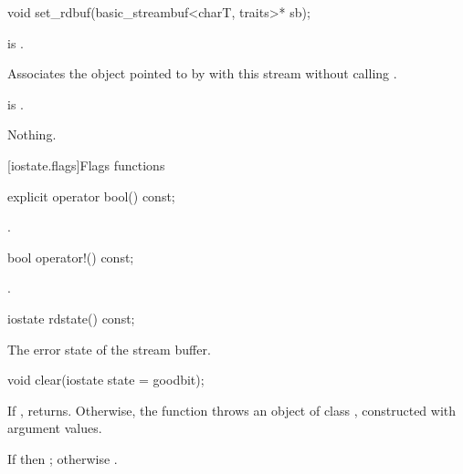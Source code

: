 %
\begin{itemdecl}
void set_rdbuf(basic_streambuf<charT, traits>* sb);
\end{itemdecl}

\begin{itemdescr}
\pnum
\expects
{} is .

\pnum
\effects
Associates the  object
pointed to by  with this stream without calling
.

\pnum
\ensures
{} is .

\pnum
\throws
Nothing.
\end{itemdescr}

[iostate.flags]{Flags functions}

%
\begin{itemdecl}
explicit operator bool() const;
\end{itemdecl}

\begin{itemdescr}
\pnum
\returns
{}.
\end{itemdescr}

%
\begin{itemdecl}
bool operator!() const;
\end{itemdecl}

\begin{itemdescr}
\pnum
\returns
{}.
\end{itemdescr}

%
\begin{itemdecl}
iostate rdstate() const;
\end{itemdecl}

\begin{itemdescr}
\pnum
\returns
The error state of the stream buffer.
\end{itemdescr}

%
\begin{itemdecl}
void clear(iostate state = goodbit);
\end{itemdecl}

\begin{itemdescr}
\pnum
\effects
If ,
returns.
Otherwise, the function throws an object of class
,
constructed with
argument values.%

\pnum
\ensures
If
then
;
otherwise
.
\end{itemdescr}

